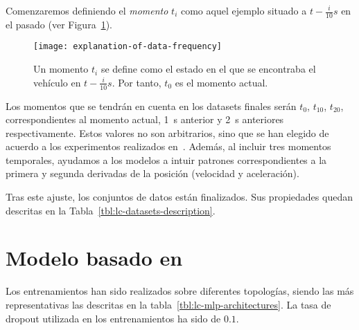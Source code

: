 Comenzaremos definiendo el \textit{momento} $t_i$ como aquel ejemplo situado a $t - \frac{i}{10}s$ en el pasado (ver Figura~\ref{fig:moments-illustration}).

\begin{figure}
	\centering
	\texttt{[image: explanation-of-data-frequency]}
	\caption[Momento $t_i$ en el conjunto de datos]{Un momento $t_i$ se define como el estado en el que se encontraba el vehículo en $t - \frac{i}{10}s$. Por tanto, $t_0$ es el momento actual.}
	\label{fig:moments-illustration}
\end{figure}

Los momentos que se tendrán en cuenta en los datasets finales serán $t_0$, $t_10$, $t_20$, correspondientes al momento actual, \SI{1}{\second} anterior y \SI{2}{\second} anteriores respectivamente. Estos valores no son arbitrarios, sino que se han elegido de acuerdo a los experimentos realizados en~\cite{diaz2018modelling}. Además, al incluir tres momentos temporales, ayudamos a los modelos a intuir patrones correspondientes a la primera y segunda derivadas de la posición (velocidad y aceleración).

Tras este ajuste, los conjuntos de datos están finalizados. Sus propiedades quedan descritas en la Tabla~\ref{tbl:lc-datasets-description}.

\section{Modelo basado en }

Los entrenamientos han sido realizados sobre diferentes topologías, siendo las más representativas las descritas en la tabla~\ref{tbl:lc-mlp-architectures}. La tasa de dropout utilizada en los entrenamientos ha sido de $0.1$.


